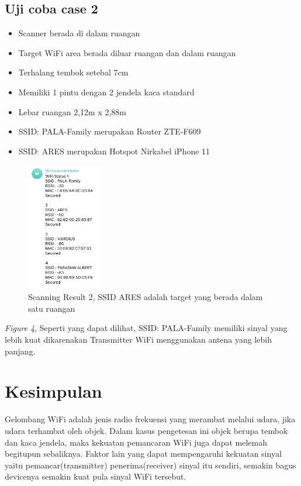 \documentclass[conference]{IEEEtran}
\begin{document}
\subsection{Uji coba case 2}

\begin{itemize}
  \item Scanner berada di dalam ruangan
  \item Target WiFi area berada diluar ruangan dan dalam ruangan
  \item Terhalang tembok setebal 7cm 
  \item Memiliki 1 pintu dengan 2 jendela kaca standard
  \item Lebar ruangan 2,12m x 2,88m
  \item SSID: PALA-Family merupakan Router ZTE-F609
  \item SSID: ARES merupakan Hotspot Nirkabel iPhone 11
\end{itemize}

\begin{figure}[h]
  \centering
  \includegraphics[width=0.30\textwidth]{scanning-result2.png}
  \caption{Scanning Result 2, SSID ARES adalah target yang berada dalam satu ruangan}
\end{figure}

\textit{Figure 4}, Seperti yang dapat dilihat, SSID: PALA-Family memiliki sinyal yang lebih kuat dikarenakan Transmitter WiFi menggunakan antena yang lebih panjang.

\section{Kesimpulan}

Gelombang WiFi adalah jenis radio frekuensi yang merambat melalui udara, jika udara terhambat oleh objek. Dalam kasus pengetesan ini objek berupa tembok dan kaca jendela, maka kekuatan pemancaran WiFi juga dapat melemah begitupun sebaliknya. Faktor lain yang dapat mempengaruhi kekuatan sinyal yaitu pemancar(transmitter) penerima(receiver) sinyal itu sendiri, semakin bagus devicenya semakin kuat pula sinyal WiFi tersebut.
\end{document}
